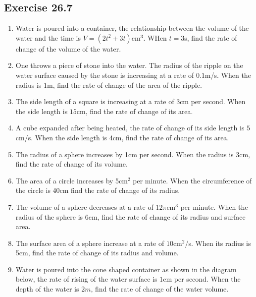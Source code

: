 \subsection{Exercise 26.7}
\begin{enumerate}
    \item Water is poured into a container, the relationship between the volume of the
          water and the time is $V = (2t^2 + 3t)$cm$^3$. WHen $t = 3$s, find the rate of
          change of the volume of the water.
    \item One throws a piece of stone into the water. The radius of the ripple on the
          water surface caused by the stone is increasing at a rate of $0.1$m/s. When the
          radius is $1$m, find the rate of change of the area of the ripple.
    \item The side length of a square is increasing at a rate of $3$cm per second. When
          the side length is $15$cm, find the rate of change of its area.
    \item A cube expanded after being heated, the rate of change of its side length is
          $5$cm/s. When the side length is $4$cm, find the rate of change of its area.
    \item The radius of a sphere increases by 1cm per second. When the radius is 3cm,
          find the rate of change of its volume.
    \item The area of a circle increases by 5cm$^2$ per minute. When the circumference of
          the circle is 40cm find the rate of change of its radius.
    \item The volume of a sphere decreases at a rate of $12\pi$cm$^3$ per minute. When
          the radius of the sphere is 6cm, find the rate of change of its radius and
          surface area.
    \item The surface area of a sphere increase at a rate of $10$cm$^2$/s. When its
          radius is 5cm, find the rate of change of its radius and volume.
    \item Water is poured into the cone shaped container as shown in the diagram below,
          the rate of rising of the water surface is $1$cm per second. When the depth of
          the water is $2m$, find the rate of change of the water volume.
          \begin{center}

\end{center}
\end{enumerate}
